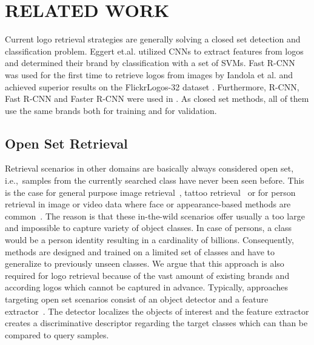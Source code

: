 \documentclass[a4paper,twoside]{article}
\newcommand{\xie}{i.e.}
\newcommand{\xeg}{e.g.}
\begin{document}



\section{\uppercase{Related Work}}
\noindent Current logo retrieval strategies are generally solving a closed set detection and classification problem. Eggert et.al. \cite{eggert2015} utilized \acp{CNN} to extract features from logos and determined their brand by classification with a set of \acp{SVM}. Fast R-CNN \cite{girshick2015} was used for the first time to retrieve logos from images by Iandola et al. \cite{iandola2015} and achieved superior results on the FlickrLogos-32 dataset \cite{romberg2011}. Furthermore, R-CNN, Fast R-CNN and Faster R-CNN were used in \cite{bao2016,oliveira2016,qi2017}. As closed set methods, all of them use the same brands both for training and for validation.

\subsection{Open Set Retrieval}
Retrieval scenarios in other domains are basically always considered open set, \xie,~samples from the currently searched class have never been seen before.
This is the case for general purpose image retrieval~\cite{sivic2003}, tattoo retrieval~\cite{manger2012} or for person retrieval in image or video data where face or appearance-based methods are common~\cite{bauml2010,weber2011,herrmann2015b}. The reason is that these in-the-wild scenarios offer usually a too large and impossible to capture variety of object classes. In case of persons, a class would be a person identity resulting in a cardinality of billions. Consequently, methods are designed and trained on a limited set of classes and have to generalize to previously unseen classes. We argue that this approach is also required for logo retrieval because of the vast amount of existing brands and according logos which cannot be captured in advance.
Typically, approaches targeting open set scenarios consist of an object detector and a feature extractor~\cite{zheng2016b}. The detector localizes the objects of interest and the feature extractor creates a discriminative descriptor regarding the target classes which can than be compared to query samples.
\end{document}
